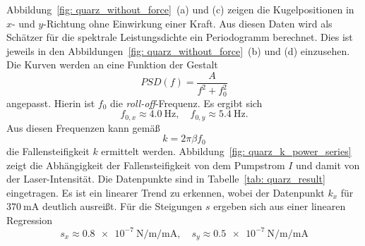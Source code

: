 Abbildung~\ref{fig: quarz_without_force}~(a) und (c) zeigen die Kugelpositionen in $x$- und $y$-Richtung ohne Einwirkung
einer Kraft. %
Aus diesen Daten wird als Schätzer für die spektrale Leistungsdichte
ein Periodogramm berechnet. Dies ist jeweils in den Abbildungen~\ref{fig: quarz_without_force}~(b) und (d) einzusehen. Die Kurven werden
an eine Funktion der Gestalt
\begin{equation}
  PSD(f) = \frac{A}{f^2 + f_0^2}
  \label{eq: lorentz}
\end{equation}
angepasst. Hierin ist $f_0$ die \emph{roll-off}-Frequenz. Es ergibt sich
\begin{equation}
  f_{0, x} \approx \SI{4.0}{\hertz}, \quad f_{0, y} \approx \SI{5.4}{\hertz}.
\end{equation}
Aus diesen Frequenzen kann gemäß
\begin{equation}
  k = 2\pi \beta f_0
\end{equation}
die Fallensteifigkeit $k$ ermittelt werden. Abbildung~\ref{fig: quarz_k_power_series} zeigt die Abhängigkeit der Fallensteifigkeit von dem
Pumpstrom $I$ und damit von der Laser-Intensität. Die Datenpunkte sind in Tabelle~\ref{tab: quarz_result} eingetragen.
Es ist ein linearer Trend zu erkennen, wobei der Datenpunkt $k_x$
für $\SI{370}{\milli\ampere}$ deutlich ausreißt. Für die Steigungen $s$ ergeben sich aus einer linearen Regression
\begin{equation}
  s_x \approx \SI{0.8e-7}{\newton \per \meter \per \milli\ampere}, \quad  s_y \approx \SI{0.5e-7}{\newton \per \meter \per \milli\ampere}
\end{equation}
